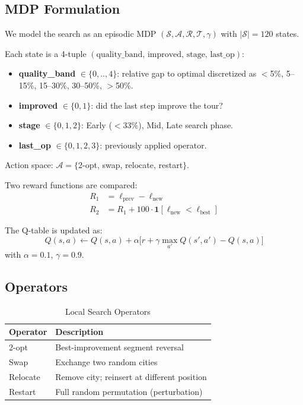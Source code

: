 \documentclass[10pt,twocolumn]{article}
\begin{document}
\subsection{MDP Formulation}

We model the search as an episodic MDP $(\mathcal{S}, \mathcal{A}, \mathcal{R},
\mathcal{T}, \gamma)$ with $|\mathcal{S}|=120$ states.

Each state is a 4-tuple $(\text{quality\_band},\, \text{improved},\,
\text{stage},\, \text{last\_op})$:
\begin{itemize}\itemsep0pt
  \item \textbf{quality\_band} $\in\{0,..,4\}$: relative gap to optimal
        discretized as $<$5\%, 5--15\%, 15--30\%, 30--50\%, $>$50\%.
  \item \textbf{improved} $\in\{0,1\}$: did the last step improve the tour?
  \item \textbf{stage} $\in\{0,1,2\}$: Early ($<$33\%), Mid, Late search phase.
  \item \textbf{last\_op} $\in\{0,1,2,3\}$: previously applied operator.
\end{itemize}

Action space: $\mathcal{A}=\{$2-opt, swap, relocate, restart$\}$.

Two reward functions are compared:
\begin{align}
  R_1 &= \ell_{\text{prev}} - \ell_{\text{new}} \\
  R_2 &= R_1 + 100\cdot\mathbf{1}[\ell_{\text{new}} < \ell_{\text{best}}]
\end{align}

The Q-table is updated as:
\begin{equation}
Q(s,a) \leftarrow Q(s,a) + \alpha\bigl[r + \gamma\max_{a'}Q(s',a') - Q(s,a)\bigr]
\end{equation}
with $\alpha=0.1$, $\gamma=0.9$.

\subsection{Operators}

\begin{table}[H]
\centering
\caption{Local Search Operators}
\small
\begin{tabular}{ll}
\toprule
\textbf{Operator} & \textbf{Description} \\
\midrule
2-opt & Best-improvement segment reversal \\
Swap & Exchange two random cities \\
Relocate & Remove city; reinsert at different position \\
Restart & Full random permutation (perturbation) \\
\bottomrule
\end{tabular}
\end{table}
\end{document}
